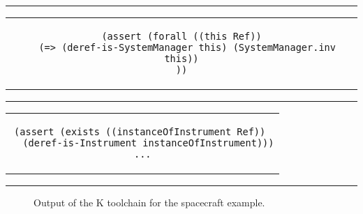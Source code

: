 \rule{\textwidth}{0.2pt}

\begin{center}
\begin{tabular}{c}
\begin{lstlisting}
(assert (forall ((this Ref))
  (=> (deref-is-SystemManager this) (SystemManager.inv this))
))
\end{lstlisting}
\end{tabular}
\end{center}

\rule{\textwidth}{0.2pt}

\begin{center}
\begin{tabular}{c}
\begin{lstlisting}
(assert (exists ((instanceOfInstrument Ref)) 
  (deref-is-Instrument instanceOfInstrument)))
...
\end{lstlisting}
\end{tabular}
\end{center}

\rule{\textwidth}{0.2pt}

\begin{figure}
\caption{Output of the K toolchain for the spacecraft example.}
\label{fig:shapes}
\end{figure}

\lstset{language=K}
